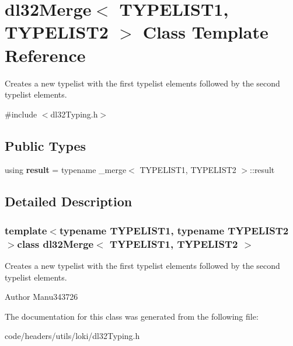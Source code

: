 \hypertarget{classdl32_merge}{\section{dl32\-Merge$<$ T\-Y\-P\-E\-L\-I\-S\-T1, T\-Y\-P\-E\-L\-I\-S\-T2 $>$ Class Template Reference}
\label{classdl32_merge}
}


Creates a new typelist with the first typelist elements followed by the second typelist elements.  




{\ttfamily \#include $<$dl32\-Typing.\-h$>$}

\subsection*{Public Types}
\begin{DoxyCompactItemize}
\item 
\hypertarget{classdl32_merge_a78002cb75fdfc7f7ba0d6a7ba7ab8d24}{using {\bfseries result} = typename \-\_\-merge$<$ T\-Y\-P\-E\-L\-I\-S\-T1, T\-Y\-P\-E\-L\-I\-S\-T2 $>$\-::result}\label{classdl32_merge_a78002cb75fdfc7f7ba0d6a7ba7ab8d24}

\end{DoxyCompactItemize}


\subsection{Detailed Description}
\subsubsection*{template$<$typename T\-Y\-P\-E\-L\-I\-S\-T1, typename T\-Y\-P\-E\-L\-I\-S\-T2$>$class dl32\-Merge$<$ T\-Y\-P\-E\-L\-I\-S\-T1, T\-Y\-P\-E\-L\-I\-S\-T2 $>$}

Creates a new typelist with the first typelist elements followed by the second typelist elements. 

\begin{DoxyAuthor}{Author}
Manu343726 
\end{DoxyAuthor}


The documentation for this class was generated from the following file\-:\begin{DoxyCompactItemize}
\item 
code/headers/utils/loki/dl32\-Typing.\-h\end{DoxyCompactItemize}
